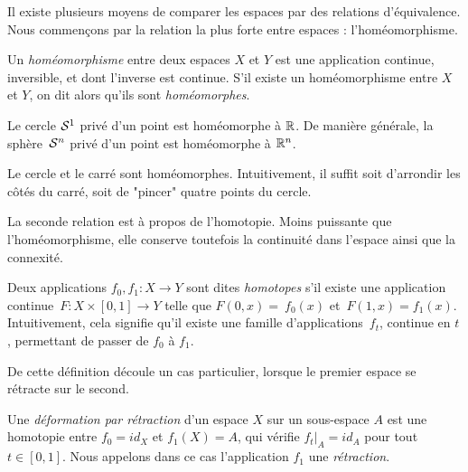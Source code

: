 Il existe plusieurs moyens de comparer les espaces par des relations d'équivalence. Nous commençons par la relation la plus forte entre espaces : l'homéomorphisme.

\begin{definition}\label{def:homeo}
Un \emph{homéomorphisme} entre deux espaces $X$ et $Y$ est une application continue, inversible, et dont l'inverse est continue. S'il existe un homéomorphisme entre $X$ et $Y$, on dit alors qu'ils sont \emph{homéomorphes}.
\end{definition}

\begin{exemple}
Le cercle $\mathcal{S}^{1}$ privé d'un point est homéomorphe à $\mathbb{R}$. De manière générale, la sphère~$\mathcal{S}^{n}$ privé d'un point est homéomorphe à $\mathbb{R}^n$.

Le cercle et le carré sont homéomorphes. Intuitivement, il suffit soit d'arrondir les côtés du carré, soit de "pincer" quatre points du cercle.
\end{exemple}

La seconde relation est à propos de l'homotopie. Moins puissante que l'homéomorphisme, elle conserve toutefois la continuité dans l'espace ainsi que la connexité.

\begin{definition}\label{def:homotopy-spaces}
Deux applications $f_0,f_1:X\to Y$ sont dites \emph{homotopes} s'il existe une application continue~$F:X\times [0,1]\to Y$ telle que $F(0,x)=~f_0(x)$ et~$F(1,x)=f_1(x)$. Intuitivement, cela signifie qu'il existe une famille d'applications~$f_t$, continue en $t$, permettant de passer de $f_0$ à $f_1$.
\end{definition}

De cette définition découle un cas particulier, lorsque le premier espace se rétracte sur le second.

\begin{definition}\label{def:retracts}
Une \emph{déformation par rétraction} d'un espace $X$ sur un sous-espace $A$ est une homotopie entre $f_0=id_X$ et $f_1(X)=A$, qui vérifie $f_t|_A=id_A$ pour tout $t\in[0,1]$. Nous appelons dans ce cas l'application $f_1$ une \emph{rétraction}.
\end{definition}


